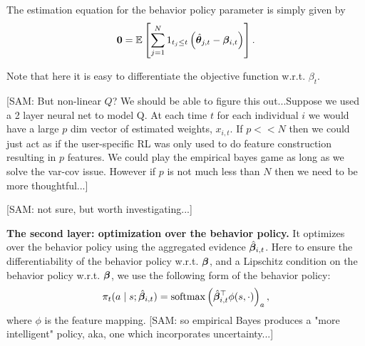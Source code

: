 \documentclass{article}
\newcommand{\sam}[1]{
  {\color{blue} [SAM: {#1}]}
 }
\begin{document}
The estimation equation for the behavior policy parameter is simply given by
$$
    \mathbf{0} = \mathbb{E}\left[ \sum_{j = 1}^N 1_{t_j\le t}\left(\hat {{\bm{\theta}}}_{j, t} - {\bm{\beta}}_{i,t}\right)\right].
$$

Note that here it is easy to differentiate the objective function w.r.t. $\beta_t$.

\sam{But non-linear $Q$?  We should be able to figure this out...Suppose we used a 2 layer neural net to model Q.  At each time $t$ for each individual $i$ we would have a large $p$ dim vector of estimated weights, $x_{i,t}$.   If $p<< N$ then we could just act as if the user-specific RL was only used to do feature construction resulting in $p$ features. We could play the empirical bayes game as long as we solve the var-cov issue.   However if $p$ is not much less than $N$ then we need to be more thoughtful...}

 \sam{not sure, but worth investigating...}

\textbf{The second layer: optimization over the behavior policy.} It optimizes over the behavior policy using the aggregated evidence $\hat {{\bm{\beta}}}_{i,t}$. Here to ensure the differentiability of the behavior policy w.r.t. ${\bm{\beta}}$, and a Lipschitz condition on the behavior policy w.r.t. ${\bm{\beta}}$, we use the following form of the behavior policy:
$$
    \pi_{t}(a \mid s; \hat {{\bm{\beta}}}_{i, t}) = \operatorname{softmax}\left(\hat {{\bm{\beta}}}_{i, t}^{\top} \phi(s, \cdot)\right)_a,
$$
where $\phi$ is the feature mapping.  \sam{so empirical Bayes produces a  "more intelligent" policy, aka, one which incorporates uncertainty...} 





 
\end{document}
